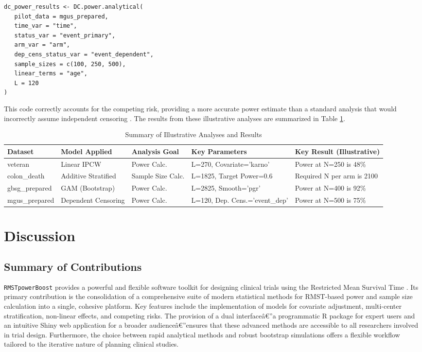 \documentclass[11pt, a4paper]{article}
\begin{document}
\begin{lstlisting}
dc_power_results <- DC.power.analytical(
   pilot_data = mgus_prepared,
   time_var = "time",
   status_var = "event_primary",
   arm_var = "arm",
   dep_cens_status_var = "event_dependent",
   sample_sizes = c(100, 250, 500),
   linear_terms = "age",
   L = 120
)
\end{lstlisting}
This code correctly accounts for the competing risk, providing a more accurate power estimate than a standard analysis that would incorrectly assume independent censoring \cite{[1]}. The results from these illustrative analyses are summarized in Table \ref{tab:example_summary}.

\begin{table}[h!]
\centering
\caption{Summary of Illustrative Analyses and Results}
\label{tab:example_summary}
\begin{tabular}{@{}lllll@{}}
\toprule
\textbf{Dataset} & \textbf{Model Applied} & \textbf{Analysis Goal} & \textbf{Key Parameters} & \textbf{Key Result (Illustrative)} \\ \midrule
veteran & Linear IPCW & Power Calc. & L=270, Covariate='karno' & Power at N=250 is 48\% \\
colon\_death & Additive Stratified & Sample Size Calc. & L=1825, Target Power=0.6 & Required N per arm is 2100 \\
gbsg\_prepared & GAM (Bootstrap) & Power Calc. & L=2825, Smooth='pgr' & Power at N=400 is 92\% \\
mgus\_prepared & Dependent Censoring & Power Calc. & L=120, Dep. Cens.='event\_dep' & Power at N=500 is 75\% \\ \bottomrule
\end{tabular}
\end{table}

\section{Discussion}

\subsection{Summary of Contributions}
\texttt{RMSTpowerBoost} provides a powerful and flexible software toolkit for designing clinical trials using the Restricted Mean Survival Time \cite{[1]}. Its primary contribution is the consolidation of a comprehensive suite of modern statistical methods for RMST-based power and sample size calculation into a single, cohesive platform. Key features include the implementation of models for covariate adjustment, multi-center stratification, non-linear effects, and competing risks. The provision of a dual interfaceâ€”a programmatic R package for expert users and an intuitive Shiny web application for a broader audienceâ€”ensures that these advanced methods are accessible to all researchers involved in trial design. Furthermore, the choice between rapid analytical methods and robust bootstrap simulations offers a flexible workflow tailored to the iterative nature of planning clinical studies.
\end{document}
